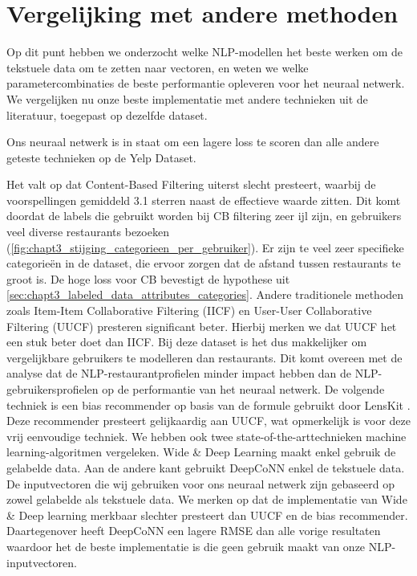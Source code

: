 \section{Vergelijking met andere methoden}
Op dit punt hebben we onderzocht welke NLP-modellen het beste werken om de tekstuele data om te zetten naar vectoren, en weten we welke parametercombinaties de beste performantie opleveren voor het neuraal netwerk. We vergelijken nu onze beste implementatie met andere technieken uit de literatuur, toegepast op dezelfde dataset.


Ons neuraal netwerk is in staat om een lagere loss te scoren dan alle andere geteste technieken op de Yelp Dataset.

Het valt op dat Content-Based Filtering uiterst slecht presteert, waarbij de voorspellingen gemiddeld 3.1 sterren naast de effectieve waarde zitten. Dit komt doordat de labels die gebruikt worden bij CB filtering zeer ijl zijn, en gebruikers veel diverse restaurants bezoeken (\autoref{fig:chapt3_stijging_categorieen_per_gebruiker}). Er zijn te veel zeer specifieke categorieën in de dataset, die ervoor zorgen dat de afstand tussen restaurants te groot is. De hoge loss voor CB bevestigt de hypothese uit \autoref{sec:chapt3_labeled_data_attributes_categories}.\newline
Andere traditionele methoden zoals Item-Item Collaborative Filtering (IICF) en User-User Collaborative Filtering (UUCF) presteren significant beter. Hierbij merken we dat UUCF het een stuk beter doet dan IICF. Bij deze dataset is het dus makkelijker om vergelijkbare gebruikers te modelleren dan restaurants. Dit komt overeen met de analyse dat de NLP-restaurantprofielen minder impact hebben dan de NLP-gebruikersprofielen op de performantie van het neuraal netwerk.
De volgende techniek is een bias recommender op basis van de formule gebruikt door LensKit \cite{bias_lenskit}. Deze recommender presteert gelijkaardig aan UUCF, wat opmerkelijk is voor deze vrij eenvoudige techniek.\newline
We hebben ook twee state-of-the-arttechnieken machine learning-algoritmen vergeleken. Wide \& Deep Learning maakt enkel gebruik de gelabelde data. Aan de andere kant gebruikt DeepCoNN enkel de tekstuele data. De inputvectoren die wij gebruiken voor ons neuraal netwerk zijn gebaseerd op zowel gelabelde als tekstuele data. We merken op dat de implementatie van Wide \& Deep learning merkbaar slechter presteert dan UUCF en de bias recommender. Daartegenover heeft DeepCoNN een lagere RMSE dan alle vorige resultaten waardoor het de beste implementatie is die geen gebruik maakt van onze NLP-inputvectoren.

